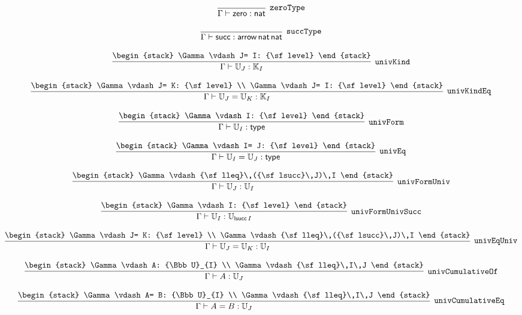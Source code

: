 \[
\infer[{\tt zeroType}]{\Gamma \vdash {\sf zero}: {\sf nat}}{}
\]

\[
\infer[{\tt succType}]{\Gamma \vdash {\sf succ}: {\sf arrow}\,{\sf nat}\,{\sf nat}}{}
\]

\[
\infer[{\tt univKind}]{\Gamma \vdash {\Bbb U}_{J}: {\Bbb K}_{I}}{
\begin{stack}
\Gamma \vdash J= I: {\sf level}
\end{stack}}
\]

\[
\infer[{\tt univKindEq}]{\Gamma \vdash {\Bbb U}_{J}= {\Bbb U}_{K}: {\Bbb K}_{I}}{
\begin{stack}
\Gamma \vdash J= K: {\sf level}
\\
\Gamma \vdash J= I: {\sf level}
\end{stack}}
\]

\[
\infer[{\tt univForm}]{\Gamma \vdash {\Bbb U}_{I}: {\sf type}}{
\begin{stack}
\Gamma \vdash I: {\sf level}
\end{stack}}
\]

\[
\infer[{\tt univEq}]{\Gamma \vdash {\Bbb U}_{I}= {\Bbb U}_{J}: {\sf type}}{
\begin{stack}
\Gamma \vdash I= J: {\sf level}
\end{stack}}
\]

\[
\infer[{\tt univFormUniv}]{\Gamma \vdash {\Bbb U}_{J}: {\Bbb U}_{I}}{
\begin{stack}
\Gamma \vdash {\sf lleq}\,({\sf lsucc}\,J)\,I
\end{stack}}
\]

\[
\infer[{\tt univFormUnivSucc}]{\Gamma \vdash {\Bbb U}_{I}: {\Bbb U}_{{\sf lsucc}\,I}}{
\begin{stack}
\Gamma \vdash I: {\sf level}
\end{stack}}
\]

\[
\infer[{\tt univEqUniv}]{\Gamma \vdash {\Bbb U}_{J}= {\Bbb U}_{K}: {\Bbb U}_{I}}{
\begin{stack}
\Gamma \vdash J= K: {\sf level}
\\
\Gamma \vdash {\sf lleq}\,({\sf lsucc}\,J)\,I
\end{stack}}
\]

\[
\infer[{\tt univCumulativeOf}]{\Gamma \vdash A: {\Bbb U}_{J}}{
\begin{stack}
\Gamma \vdash A: {\Bbb U}_{I}
\\
\Gamma \vdash {\sf lleq}\,I\,J
\end{stack}}
\]

\[
\infer[{\tt univCumulativeEq}]{\Gamma \vdash A= B: {\Bbb U}_{J}}{
\begin{stack}
\Gamma \vdash A= B: {\Bbb U}_{I}
\\
\Gamma \vdash {\sf lleq}\,I\,J
\end{stack}}
\]

